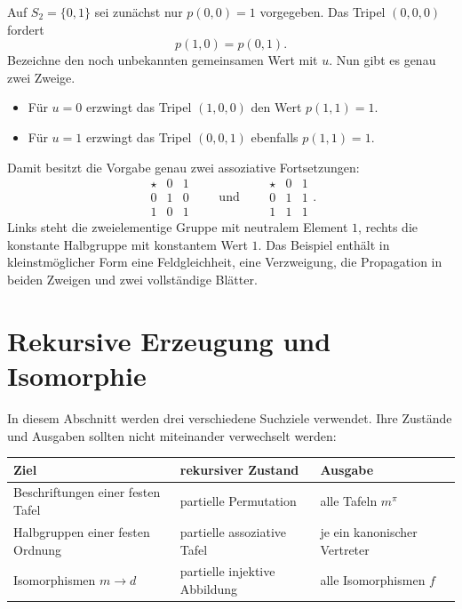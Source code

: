 \documentclass[main.tex]{subfiles}
\begin{document}
\begin{example}
Auf \(S_2=\{0,1\}\) sei zunächst nur \(p(0,0)=1\) vorgegeben.  Das Tripel
\((0,0,0)\) fordert
\[
  p(1,0)=p(0,1).
\]
Bezeichne den noch unbekannten gemeinsamen Wert mit \(u\).  Nun gibt es genau
zwei Zweige.
\begin{itemize}
  \item Für \(u=0\) erzwingt das Tripel \((1,0,0)\) den Wert
    \(p(1,1)=1\).
  \item Für \(u=1\) erzwingt das Tripel \((0,0,1)\) ebenfalls
    \(p(1,1)=1\).
\end{itemize}
Damit besitzt die Vorgabe genau zwei assoziative Fortsetzungen:
\[
\begin{array}{c|cc}
\star&0&1\\\hline
0&1&0\\
1&0&1
\end{array}
\qquad\text{und}\qquad
\begin{array}{c|cc}
\star&0&1\\\hline
0&1&1\\
1&1&1
\end{array}.
\]
Links steht die zweielementige Gruppe mit neutralem Element \(1\), rechts
die konstante Halbgruppe mit konstantem Wert \(1\).  Das Beispiel enthält in
kleinstmöglicher Form eine Feldgleichheit, eine Verzweigung, die Propagation
in beiden Zweigen und zwei vollständige Blätter.
\end{example}


\section{Rekursive Erzeugung und Isomorphie}

In diesem Abschnitt werden drei verschiedene Suchziele verwendet.  Ihre
Zustände und Ausgaben sollten nicht miteinander verwechselt werden:
\begin{center}
\small
\begin{tabularx}{\textwidth}{@{}lXl@{}}
\toprule
\textbf{Ziel}&\textbf{rekursiver Zustand}&\textbf{Ausgabe}\\
\midrule
Beschriftungen einer festen Tafel&partielle Permutation&alle Tafeln \(m^\pi\)\\
Halbgruppen einer festen Ordnung&partielle assoziative Tafel&je ein kanonischer Vertreter\\
Isomorphismen \(m\to d\)&partielle injektive Abbildung&alle Isomorphismen \(f\)\\
\bottomrule
\end{tabularx}
\end{center}
\end{document}
